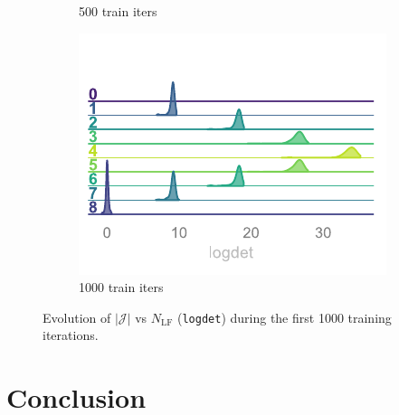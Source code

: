 \documentclass[a4paper,11pt]{article}
\begin{document}
\begin{figure}[htpb!]
\begin{subfigure}{0.31\textwidth}
        \caption{\label{subfig:logdet2} 500 train iters}
    \end{subfigure}
    \hfill
    \begin{subfigure}{0.31\textwidth}
        \includegraphics[width=\textwidth]{assets/logdet-3.pdf}
        \caption{\label{subfig:logdet3} 1000 train iters}
    \end{subfigure}
    \caption{\label{fig:logdet}Evolution of $\left|\mathcal{J}\right|$ vs $N_{\mathrm{LF}}$ (\texttt{logdet}) during the first 1000 training iterations.}
\end{figure}
%
%  


\section{\label{sec:conclusion}Conclusion}
\color{red}{TODO}


\end{document}
